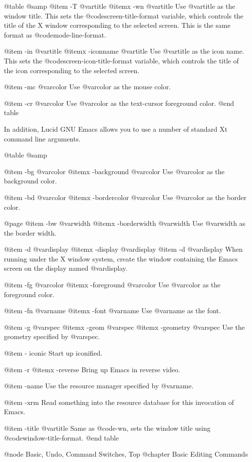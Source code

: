 {{@table @samp
@item -T @var{title}
@itemx -wn @var{title}
Use @var{title} as the window title. This sets the
@code{screen-title-format} variable, which controls the title of the X
window corresponding to the selected screen.  This is the same format as
@code{mode-line-format}.

@item -in @var{title}
@itemx -iconname @var{title}
Use @var{title} as the icon name. This sets the
@code{screen-icon-title-format} variable, which controls the title of
the icon corresponding to the selected screen.

@item -mc @var{color}
Use @var{color} as the mouse color.

@item -cr @var{color}
Use @var{color} as the text-cursor foreground color.
@end table

In addition, Lucid GNU Emacs allows you to use a number of standard Xt
command line arguments. 

@table @samp

@item -bg @var{color}
@itemx -background @var{color}
Use @var{color} as the background color.

@item -bd @var{color}
@itemx -bordercolor @var{color}
Use @var{color} as the border color.

@page
@item -bw @var{width}
@itemx -borderwidth @var{width}
Use @var{width} as the border width.

@item -d @var{display}
@itemx -display @var{display}
@item -d @var{display}
When running under the X window system, create the window containing the
Emacs screen on the display named @var{display}.

@item -fg @var{color}
@itemx -foreground @var{color}
Use @var{color} as the foreground color.

@item -fn @var{name}
@itemx -font @var{name}
Use @var{name} as the font.

@item -g @var{spec}
@itemx -geom @var{spec}
@itemx -geometry @var{spec}
Use the geometry specified by @var{spec}.

@item - iconic
Start up iconified.

@item -r
@itemx -reverse
Bring up Emacs in reverse video.

@item -name
Use the resource manager specified by @var{name}.

@item -xrm
Read something into the resource database for this invocation of Emacs. 

@item -title @var{title}
Same as @code{-wn}, sets the window title using @code{window-title-format}.
@end table

@node Basic, Undo, Command Switches, Top
@chapter Basic Editing Commands

}}
